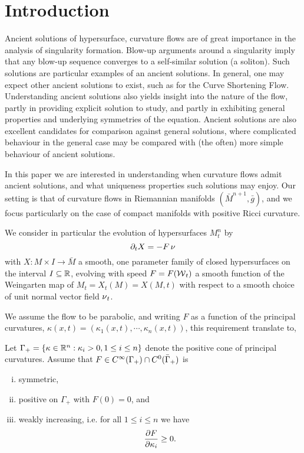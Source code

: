 \documentclass{amsart}
\begin{document}
\section{Introduction}
\label{sec:intro}

Ancient solutions of hypersurface, curvature flows are of great importance in the analysis of singularity formation. Blow-up arguments around a singularity imply that any blow-up sequence converges to a self-similar solution (a soliton). Such solutions are particular examples of an ancient solutions. In general, one may expect other ancient solutions to exist, such as for the Curve Shortening Flow. Understanding ancient solutions also yields insight into the nature of the flow, partly in providing explicit solution to study, and partly in exhibiting general properties and underlying symmetries of the equation. Ancient solutions are also excellent candidates for comparison against general solutions, where complicated behaviour in the general case may be compared with (the often) more simple behaviour of ancient solutions.

In this paper we are interested in understanding when curvature flows admit ancient solutions, and what uniqueness properties such solutions may enjoy. Our setting is that of curvature flows in Riemannian manifolds \((\bar{M}^{n+1}, \bar{g})\), and we focus particularly on the case of compact manifolds with positive Ricci curvature. 

We consider in particular the evolution of hypersurfaces $M^n_t$ by
\begin{equation}
\label{eq:CurvFlow}
\partial_t X = -F \nor
\end{equation}
with \(X : M \times I \to \bar{M}\) a smooth, one parameter family of closed hypersurfaces on the interval \(I \subseteq \R\), evolving with speed \(F = F(\weingarten_t)\) a smooth function of the Weingarten map of \(M_t = X_t(M) = X(M, t)\) with respect to a smooth choice of unit normal vector field \(\nor_t\).

We assume the flow to be parabolic, and writing \(F\) as a function of the principal curvatures, \(\kappa(x, t) = (\kappa_1(x,t), \cdots, \kappa_n(x,t))\), this requirement translate to,

\begin{ass}
\label{ass:speed}
Let $\Gamma_{+}= \{\kappa \in \R^n : \kappa_i > 0, 1\leq i\leq n\}$ denote the positive cone of principal curvatures. Assume that $F \in C^{\infty}(\Gamma_{+}) \cap C^{0}(\-\Gamma_{+})$ is
\begin{enumerate}[(i)]
\item symmetric,
\item positive on $\Gamma_{+}$ with $F(0)=0$, and
\item weakly increasing, i.e. for all $1\leq i\leq n$ we have
\[
\frac{\del F}{\del \kappa_i} \geq 0.
\]
\end{enumerate}
\end{ass}
\end{document}
